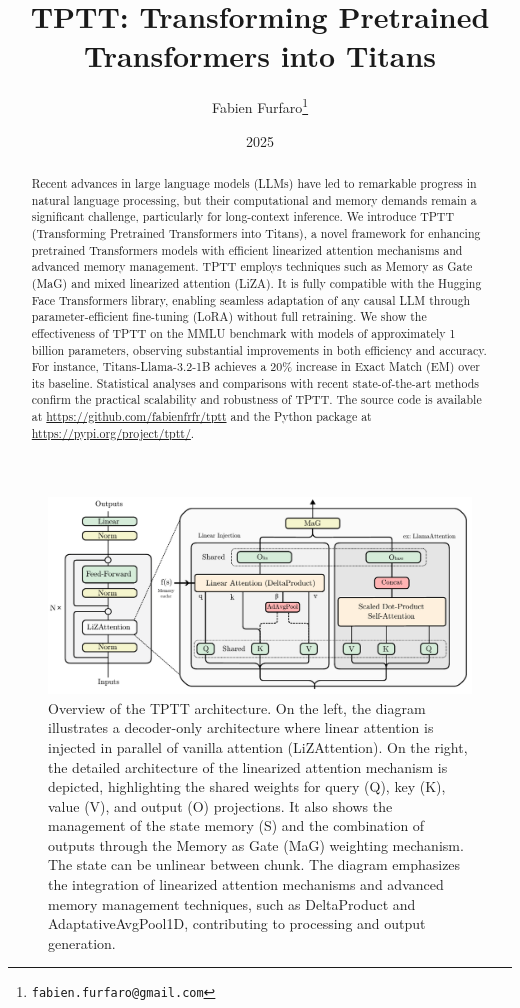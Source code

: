 \documentclass[10pt,a4paper]{article}
\title{\Large\textbf{TPTT: Transforming Pretrained Transformers into Titans}}
\author{\large Fabien Furfaro\thanks{\texttt{fabien.furfaro@gmail.com}}}
\date{\large 2025}
\begin{document}
\maketitle

\begin{abstract}
Recent advances in large language models (LLMs) have led to remarkable progress in natural language processing, but their computational and memory demands remain a significant challenge, particularly for long-context inference. We introduce TPTT (Transforming Pretrained Transformers into Titans), a novel framework for enhancing pretrained Transformers models with efficient linearized attention mechanisms and advanced memory management. TPTT employs techniques such as Memory as Gate (MaG) and mixed linearized attention (LiZA). It is fully compatible with the Hugging Face Transformers library, enabling seamless adaptation of any causal LLM through parameter-efficient fine-tuning (LoRA) without full retraining. We show the effectiveness of TPTT on the MMLU benchmark with models of approximately 1 billion parameters, observing substantial improvements in both efficiency and accuracy. For instance, Titans-Llama-3.2-1B achieves a 20\% increase in Exact Match (EM) over its baseline. Statistical analyses and comparisons with recent state-of-the-art methods confirm the practical scalability and robustness of TPTT. The source code is available at \url{https://github.com/fabienfrfr/tptt} and the Python package at \url{https://pypi.org/project/tptt/}.
\end{abstract}


\begin{figure}[ht]
    \centering
    \includegraphics[width=0.8\linewidth]{fig.pdf}
    \caption{Overview of the TPTT architecture. On the left, the diagram illustrates a decoder-only architecture where linear attention is injected in parallel of vanilla attention (LiZAttention). On the right, the detailed architecture of the linearized attention mechanism is depicted, highlighting the shared weights for query (Q), key (K), value (V), and output (O) projections. It also shows the management of the state memory (S) and the combination of outputs through the Memory as Gate (MaG) weighting mechanism. The state can be unlinear between chunk. The diagram emphasizes the integration of linearized attention mechanisms and advanced memory management techniques, such as DeltaProduct and AdaptativeAvgPool1D, contributing to processing and output generation.}
    \label{fig:approach_overview}
\end{figure}
\end{document}
